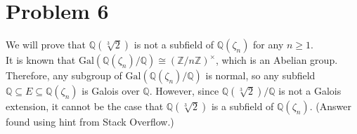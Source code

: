 \documentclass[10pt]{extarticle}
\newcommand{\Q}{\mathbb{Q}}
\newcommand{\Z}{\mathbb{Z}}
\begin{document}
\begin{enumerate}[(a)]
\begin{center}
      \end{center}
  \end{enumerate}
  \section{Problem 6}%
  We will prove that $\Q(\sqrt[3]{2})$ is not a subfield of $\Q(\zeta_n)$ for any $n\geq 1$.\\

  It is known that $\text{Gal}(\Q(\zeta_n)/\Q)\cong \left(\Z/n\Z\right)^{\times}$, which is an Abelian group. Therefore, any subgroup of $\text{Gal}\left(\Q(\zeta_n)/\Q\right)$ is normal, so any subfield $\Q \subseteq E\subseteq \Q(\zeta_n)$ is Galois over $\Q$. However, since $\Q(\sqrt[3]{2})/\Q$ is not a Galois extension, it cannot be the case that $\Q(\sqrt[3]{2})$ is a subfield of $\Q(\zeta_n)$. {\tiny (Answer found using hint from Stack Overflow.)}
\end{document}
